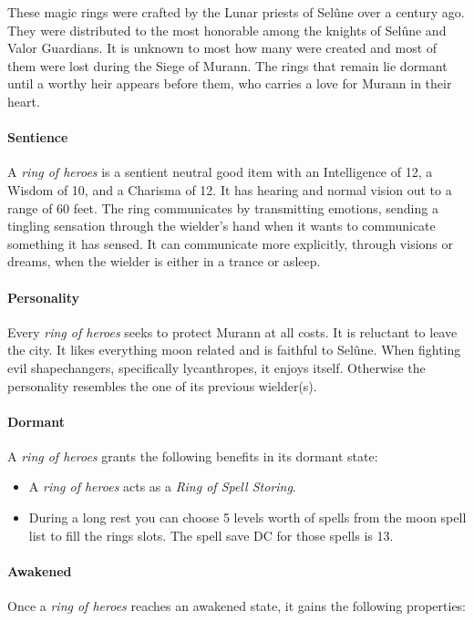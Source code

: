 \documentclass[letter,10pt,twocolumn,openany]{dndbook}
\begin{document}


These magic rings were crafted by the Lunar priests of Selûne over a century ago.
They were distributed to the most honorable among the knights of Selûne and Valor Guardians.
It is unknown to most how many were created and most of them were lost during the Siege of Murann.
The rings that remain lie dormant until a worthy heir appears before them, who carries a love for Murann in their heart.

\paragraph{Sentience}
A \textit{ring of heroes} is a sentient neutral good item with an Intelligence of 12, a Wisdom of 10, and a Charisma of 12.
It has hearing and normal vision out to a range of 60 feet.
The ring communicates by transmitting emotions, sending a tingling sensation through the wielder's hand when it wants to communicate something it has sensed.
It can communicate more explicitly, through visions or dreams, when the wielder is either in a trance or asleep.

\paragraph{Personality}
Every \textit{ring of heroes} seeks to protect Murann at all costs.
It is reluctant to leave the city.
It likes everything moon related and is faithful to Selûne.
When fighting evil shapechangers, specifically lycanthropes, it enjoys itself.
Otherwise the personality resembles the one of its previous wielder(s).

\paragraph{Dormant}
A \textit{ring of heroes} grants the following benefits in its dormant state:
\begin{itemize}
    \item A \textit{ring of heroes} acts as a \textit{Ring of Spell Storing}.
    \item During a long rest you can choose 5 levels worth of spells from the moon spell list to fill the rings slots.
          The spell save DC for those spells is 13.
\end{itemize}

\paragraph{Awakened}
Once a \textit{ring of heroes} reaches an awakened state, it gains the following properties:
\end{document}
